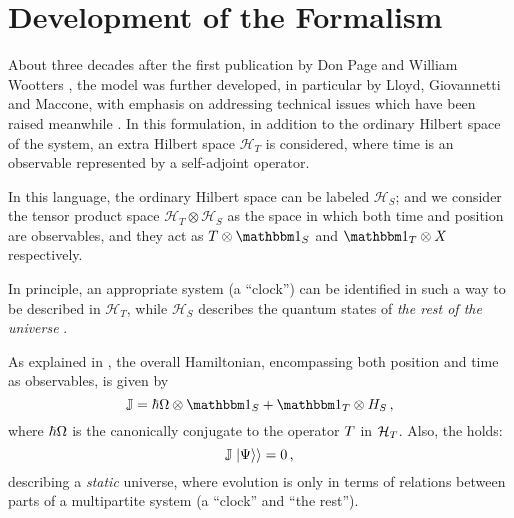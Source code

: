 \section{Development of the Formalism}

About three decades after the first publication by
Don Page and William Wootters \parencite{PageWootters},
the model was further developed,
in particular by Lloyd, Giovannetti and Maccone,
with emphasis on addressing technical issues which have been raised meanwhile
\parencite{Lloyd:Time}.
In this formulation,
in addition to the ordinary Hilbert space of the system,
an extra Hilbert space $\mathcal{H}_T$ is considered,
where time is an observable
represented by a self-adjoint operator.

In this language, the ordinary Hilbert space can be labeled $\mathcal{H}_S$;
and we consider the tensor product space $\mathcal{H}_T \otimes \mathcal{H}_S$ as
the space in which both time and position are observables, and they act as
$T \otimes \idop_S$ and $\idop_T \otimes X$
respectively.

In principle, an appropriate system (a ``clock'') can be identified in such a way
to be described in $\mathcal{H}_T$, while $\mathcal{H}_S$ describes
the quantum states of \emph{the rest of the universe} \parencite{Marletto:Evolution}.

As explained in \cite{Lloyd:Time, Maccone:Pauli}, the overall Hamiltonian,
encompassing both position and time as observables, is given by
\begin{equation}\label{eq:pwHamiltonian}
  \op{\mathbb{J}} = \hbar\op{\Omega}\ox\idop_S + \idop_T\ox\op{H}_S \,\text{,}
\end{equation}
where $\hbar{\Omega}$ is the canonically conjugate to the operator ${T}$ in $\mathcal{H}_T$.
Also, the  holds:
\begin{equation}\label{eq:Wheeler-DeWitt}
  {\mathbb{J}}\left.\left| \Psi \right\rangle\right\rangle = 0 \,\text{,}
\end{equation}
describing a \emph{static} universe, where evolution is only
in terms of relations between parts of a multipartite system
(a ``clock'' and ``the rest'').


